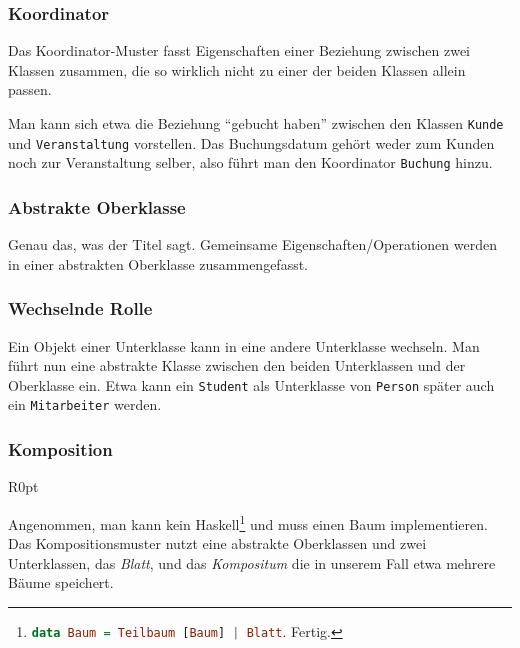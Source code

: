 \documentclass{panikzettel}
\begin{document}
\subsubsection{Koordinator}

Das Koordinator-Muster fasst Eigenschaften einer Beziehung zwischen zwei Klassen zusammen, die so wirklich nicht zu einer der beiden Klassen allein passen.

Man kann sich etwa die Beziehung ``gebucht haben'' zwischen den Klassen  \lstinline{Kunde} und \lstinline{Veranstaltung} vorstellen. Das Buchungsdatum gehört weder zum Kunden noch zur Veranstaltung selber, also führt man den Koordinator \lstinline{Buchung} hinzu.

\subsubsection{Abstrakte Oberklasse}

Genau das, was der Titel sagt. Gemeinsame Eigenschaften/Operationen werden in einer abstrakten Oberklasse zusammengefasst.

\subsubsection{Wechselnde Rolle}

Ein Objekt einer Unterklasse kann in eine andere Unterklasse wechseln. Man führt nun eine abstrakte Klasse zwischen den beiden Unterklassen und der Oberklasse ein. Etwa kann ein \lstinline{Student} als Unterklasse von \lstinline{Person} später auch ein \lstinline{Mitarbeiter} werden.

\subsubsection{Komposition}
\label{sec:komposition}

\begin{wrapfigure}[6]{R}{0pt}
\end{wrapfigure}

Angenommen, man kann kein Haskell\footnote{\lstinline[language=Haskell]{data Baum = Teilbaum [Baum] | Blatt}. Fertig.} und muss einen Baum implementieren. Das Kompositionsmuster nutzt eine abstrakte Oberklassen und zwei Unterklassen, das \emph{Blatt}, und das \emph{Kompositum} die in unserem Fall etwa mehrere Bäume speichert.
\end{document}
